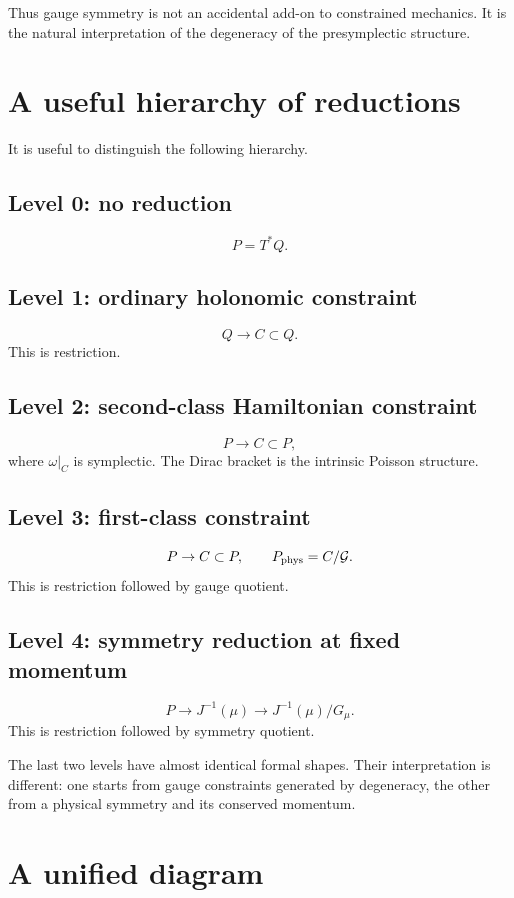 \documentclass[11pt,a4paper]{article}
\theoremstyle{definition}
\begin{document}
Thus gauge symmetry is not an accidental add-on to constrained mechanics.  It
is the natural interpretation of the degeneracy of the presymplectic
structure.

\section{A useful hierarchy of reductions}

It is useful to distinguish the following hierarchy.

\subsection*{Level 0: no reduction}
\[
        P=T^*Q.
\]

\subsection*{Level 1: ordinary holonomic constraint}
\[
        Q\to C\subset Q.
\]
This is restriction.

\subsection*{Level 2: second-class Hamiltonian constraint}
\[
        P\to C\subset P,
\]
where $\omega|_C$ is symplectic.  The Dirac bracket is the intrinsic Poisson
structure.

\subsection*{Level 3: first-class constraint}
\[
        P\to C\subset P,
        \qquad
        P_{\rm phys}=C/\mathcal G.
\]
This is restriction followed by gauge quotient.

\subsection*{Level 4: symmetry reduction at fixed momentum}
\[
        P\to J^{-1}(\mu)
        \to
        J^{-1}(\mu)/G_\mu.
\]
This is restriction followed by symmetry quotient.

The last two levels have almost identical formal shapes.  Their interpretation
is different: one starts from gauge constraints generated by degeneracy, the
other from a physical symmetry and its conserved momentum.

\section{A unified diagram}
\end{document}
